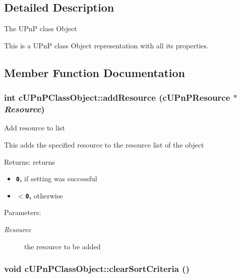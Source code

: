 \subsection{Detailed Description}
The UPnP class Object

This is a UPnP class Object representation with all its properties. 

\subsection{Member Function Documentation}
\hypertarget{classcUPnPClassObject_3132df806f003bde133e6724125366f2}{
\subsubsection[{addResource}]{\setlength{\rightskip}{0pt plus 5cm}int cUPnPClassObject::addResource ({\bf cUPnPResource} $\ast$ {\em Resource})}}
\label{classcUPnPClassObject_3132df806f003bde133e6724125366f2}


Add resource to list

This adds the specified resource to the resource list of the object

\begin{Desc}
\item[Returns:]returns\begin{itemize}
\item {\bf {\tt 0},} if setting was successful\item {\bf {\tt $<$0},} otherwise \end{itemize}
\end{Desc}
\begin{Desc}
\item[Parameters:]
\begin{description}
\item[{\em Resource}]the resource to be added \end{description}
\end{Desc}
\hypertarget{classcUPnPClassObject_19295252a40ad5fd1a4870a473ac90ea}{
\subsubsection[{clearSortCriteria}]{\setlength{\rightskip}{0pt plus 5cm}void cUPnPClassObject::clearSortCriteria ()}}
\label{classcUPnPClassObject_19295252a40ad5fd1a4870a473ac90ea}


